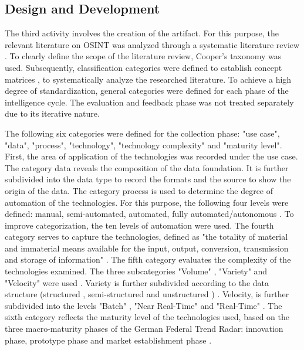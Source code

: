 \documentclass[10pt]{article}
\begin{document}
\subsection{Design and Development}

The third activity involves the creation of the artifact. For this
purpose, the relevant literature on OSINT was analyzed through a
systematic literature review \cite{Cleven.2009}. To clearly define the scope of the literature
review, Cooper's taxonomy \cite{Cooper.1988} was used. Subsequently, classification
categories were defined to establish concept matrices \cite{Webster.2002},
to systematically analyze the researched literature. To achieve a high degree of standardization,
general categories were defined for each phase of the intelligence
cycle. The evaluation and feedback phase was not treated separately due
to its iterative nature.

The following six categories were defined for the collection
phase: "use case", "data", "process", "technology", "technology
complexity" and "maturity level". First, the area of application
of the technologies was recorded under the use case. The
category data reveals the composition of the data foundation. It is further subdivided
into the data type to record the formats and
the source to show the origin of the data. The category
process is used to determine the degree of automation of the technologies. For this purpose, the following
four levels were defined: manual, semi-automated, automated,
\cite{Duncheon.2002} fully automated/autonomous \cite{Billings.1997,Endsley.1999}.
To improve categorization, the ten levels of automation \cite{Sheridan.1978,Parasuraman.2000}
were used. The fourth category serves to capture the technologies, defined
as "the totality of material and immaterial means available for
the input, output, conversion, transmission and storage of information" \cite{Bleck.2004}.
The fifth category evaluates the complexity of the technologies
examined. The three subcategories
"Volume" \cite{OLeary.2012}, "Variety" and "Velocity" were used \cite{Elgendy.,Russom.2011,Singh.2012}.
Variety is further subdivided according to the data structure (structured \cite{Lin.2018},
semi-structured and unstructured \cite{Katal.2013,Praveen.2020}) \cite{OLeary.2012}. Velocity,
is further subdivided into the levels "Batch" \cite{Carbone.2015}, "Near Real-Time"
\cite{Stankovic.1990,Gomes.2021} and "Real-Time" \cite{Stankovic.1990}. The sixth category reflects the
maturity level of the technologies used, based on the three macro-maturity phases of the
German Federal Trend Radar: innovation phase, prototype phase and
market establishment phase \cite{Stich.2022}.
\end{document}

